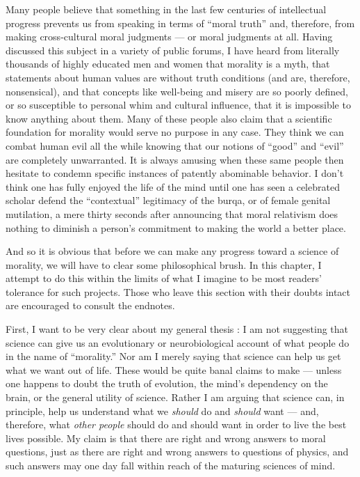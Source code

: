 \documentclass[a4paper,14pt]{extarticle}
\begin{document}
Many people believe that something in the last few centuries of intellectual progress prevents us from speaking in terms of ``moral truth'' and, therefore, from making cross-cultural moral judgments --- or moral judgments at all.
Having discussed this subject in a variety of public forums, I have heard from literally thousands of highly educated men and women that morality is a myth, that statements about human values are without truth conditions (and are, therefore, nonsensical), and that concepts like well-being and misery are so poorly defined, or so susceptible to personal whim and cultural influence, that it is impossible to know anything about them.
Many of these people also claim that a scientific foundation for morality would serve no purpose in any case.
They think we can combat human evil all the while knowing that our notions of ``good'' and ``evil'' are completely unwarranted.
It is always amusing when these same people then hesitate to condemn specific instances of patently abominable behavior.
I don't think one has fully enjoyed the life of the mind until one has seen a celebrated scholar defend the ``contextual'' legitimacy of the burqa, or of female genital mutilation, a mere thirty seconds after announcing that moral relativism does nothing to diminish a person's commitment to making the world a better place.

And so it is obvious that before we can make any progress toward a science of morality, we will have to clear some philosophical brush.
In this chapter, I attempt to do this within the limits of what I imagine to be most readers' tolerance for such projects.
Those who leave this section with their doubts intact are encouraged to consult the endnotes.

First, I want to be very clear about my general thesis :
I am not suggesting that science can give us an evolutionary or neurobiological account of what people do in the name of ``morality.''
Nor am I merely saying that science can help us get what we want out of life.
These would be quite banal claims to make --- unless one happens to doubt the truth of evolution, the mind's dependency on the brain, or the general utility of science.
Rather I am arguing that science can, in principle, help us understand what we \textit{should} do and \textit{should} want --- and, therefore, what \textit{other people} should do and should want in order to live the best lives possible.
My claim is that there are right and wrong answers to moral questions, just as there are right and wrong answers to questions of physics, and such answers may one day fall within reach of the maturing sciences of mind.
\end{document}
